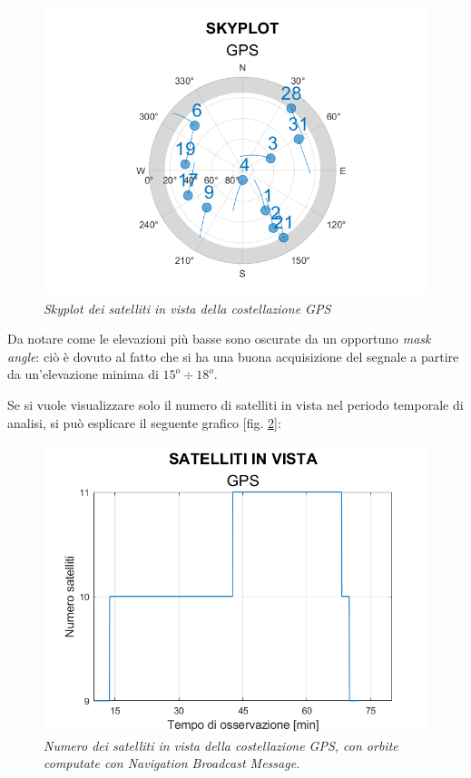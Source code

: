\documentclass[a4paper,11pt,twoside]{book}
\begin{document}
\begin{enumerate}
\begin{itemize}[-]
\begin{enumerate}
				\begin{figure}[H]
					\centering
					\includegraphics[scale=0.55]{"Immagini workbook/Immagini esp2/skyplotbrd"}
					\caption{\textit{Skyplot dei satelliti in vista della costellazione GPS}}
					\label{fig:skyplotbrd}
				\end{figure}
			
				Da notare come le elevazioni più basse sono oscurate da un opportuno \textit{mask angle}: ciò è dovuto al fatto che si ha una buona acquisizione del segnale a partire da un'elevazione minima di $15^o \div 18^o$.
				
				Se si vuole visualizzare solo il numero di satelliti in vista nel periodo temporale di analisi, si può esplicare il seguente grafico [fig. \ref{satvista}]:
				
				\begin{figure}[H]
					\centering
					\includegraphics[scale=0.55]{"Immagini workbook/Immagini esp2/satvista"}
					\caption{\textit{Numero dei satelliti in vista della costellazione GPS, con orbite computate con Navigation Broadcast Message.}}
					\label{satvista}
				\end{figure}
			

\end{enumerate}
\end{itemize}
\end{enumerate}
\end{document}
